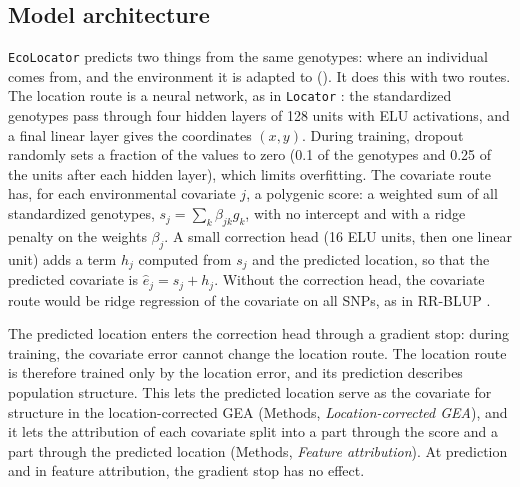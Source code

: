 \documentclass[]{article}
\newcommand{\ecolocator}{\texttt{EcoLocator}\xspace}
\providecommand{\llabel}[1]{}%
\begin{document}
\subsection{Model architecture}

\ecolocator predicts two things from the same genotypes:
where an individual comes from,
and the environment it is adapted to ().\llabel{arch}
It does this with two routes.
The location route is a neural network, as in \texttt{Locator} \citep{battey_predicting_2020}:
the standardized genotypes pass through four hidden layers
of 128 units with ELU activations,
and a final linear layer gives the coordinates $(x, y)$.
During training, dropout randomly sets a fraction of the values to zero
(0.1 of the genotypes and 0.25 of the units after each hidden layer),
which limits overfitting.
The covariate route has, for each environmental covariate $j$,
a polygenic score:
a weighted sum of all standardized genotypes, $s_j = \sum_k \beta_{jk} g_k$,
with no intercept and with a ridge penalty on the weights $\beta_j$.
A small correction head (16 ELU units, then one linear unit)
adds a term $h_j$ computed from $s_j$ and the predicted location,
so that the predicted covariate is $\hat{e}_j = s_j + h_j$.
Without the correction head,
the covariate route would be ridge regression of the covariate on all SNPs,
as in RR-BLUP \citep{meuwissen_prediction_2001, endelman_ridge_2011}.

The predicted location enters the correction head through a gradient stop:
during training, the covariate error cannot change the location route.
The location route is therefore trained only by the location error,
and its prediction describes population structure.
This lets the predicted location serve as the covariate for structure
in the location-corrected GEA (Methods, \textit{Location-corrected GEA}),
and it lets the attribution of each covariate split into a part
through the score and a part through the predicted location
(Methods, \textit{Feature attribution}).
At prediction and in feature attribution, the gradient stop has no effect.
\end{document}
